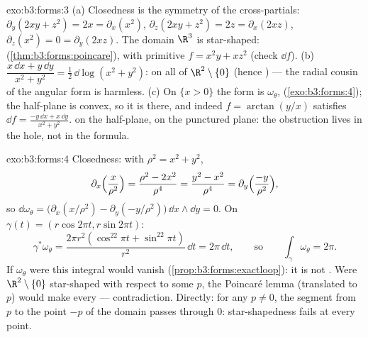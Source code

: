 \begin{solution}{exo:b3:forms:3}
(a) Closedness is the symmetry of the cross-partials:
$\partial_y(2xy + z^2) = 2x = \partial_x(x^2)$,
$\partial_z(2xy + z^2) = 2z = \partial_x(2xz)$,
$\partial_z(x^2) = 0 = \partial_y(2xz)$. The domain $\R^3$
is star-shaped:  (\cref{thm:b3:forms:poincare}), with
primitive $f = x^2y + xz^2$ (check $\dd f$).
(b) $\dfrac{x\,\dd x + y\,\dd y}{x^2 + y^2} =
\tfrac12\,\dd\log(x^2 + y^2)$:  on all of
$\R^2\setminus\{0\}$ (hence ) --- the radial cousin of
the angular form is harmless.
(c) On $\{x > 0\}$ the form is $\omega_\theta$, 
(\cref{exo:b3:forms:4}); the half-plane is convex, so it is
 there, and indeed $f = \arctan(y/x)$ satisfies $\dd f
= \frac{-y\,\dd x + x\,\dd y}{x^2 + y^2}$.  on the
half-plane,  on the punctured plane: the
obstruction lives in the hole, not in the formula.
\end{solution}

\begin{solution}{exo:b3:forms:4}
Closedness: with $\rho^2 = x^2 + y^2$,
\[
\partial_x\Bigl(\frac{x}{\rho^2}\Bigr) = \frac{\rho^2 -
2x^2}{\rho^4} = \frac{y^2 - x^2}{\rho^4} =
\partial_y\Bigl(\frac{-y}{\rho^2}\Bigr),
\]
so $\dd\omega_\theta = \bigl(\partial_x(x/\rho^2) -
\partial_y(-y/\rho^2)\bigr)\,\dd x\wedge\dd y = 0$. On
$\gamma(t) = (r\cos2\pi t, r\sin2\pi t)$:
\[
\gamma^*\omega_\theta = \frac{2\pi r^2(\cos^22\pi t +
\sin^22\pi t)}{r^2}\,\dd t = 2\pi\,\dd t,
\qquad\text{so}\qquad
\int_\gamma\omega_\theta = 2\pi .
\] If $\omega_\theta$ were
 this integral would vanish
(\cref{prop:b3:forms:exactloop}): it is not . Were
$\R^2\setminus\{0\}$ star-shaped with respect to some $p$,
the Poincar\'e lemma (translated to $p$) would make every
  --- contradiction. Directly: for any $p
\neq 0$, the segment from $p$ to the point $-p$ of the
domain passes through $0$: star-shapedness fails at every
point.
\end{solution}

